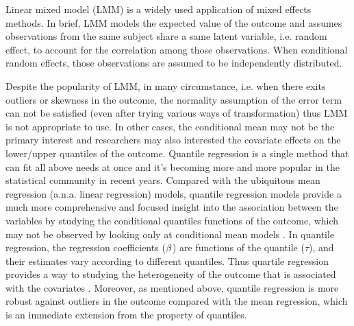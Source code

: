 Linear mixed model (LMM) is a widely used application of mixed effects methods. In brief, LMM models the expected value of the outcome and assumes observations from the same subject share a same latent variable, i.e. random effect, to account for the correlation among those observations. When conditional random effects, those observations are assumed to be independently distributed.

Despite the popularity of LMM, in many circumstance, i.e. when there exits outliers or skewness in the outcome,  the normality assumption of the error term can not be satisfied (even after trying various ways of transformation) thus LMM is not appropriate to use. In other cases, the conditional mean may not be the primary interest and researchers may also interested the covariate effects on the lower/upper quantiles of the outcome. Quantile regression is a single method that can fit all above needs at once and it's becoming more and more popular in the statistical community in recent years. Compared with the ubiquitous mean regression (a.n.a. linear regression) models, quantile regression models provide a much more comprehensive and focused insight into the association between the variables by studying the conditional quantiles functions of the outcome,  which may not be observed by looking only at conditional mean models \citep{koenker2005quantile}. In quantile regression, the regression coefficients (${\bf \beta}$) are functions of the quantile ($\tau$), and their estimates vary according to different quantiles. Thus quartile regression provides a way to studying the heterogeneity of the outcome that is associated with the covariates \citep{koenker2005quantile}. Moreover, as mentioned above, quantile regression is more robust against outliers in the outcome compared with the mean regression, which is an immediate extension from the property of quantiles. \par


